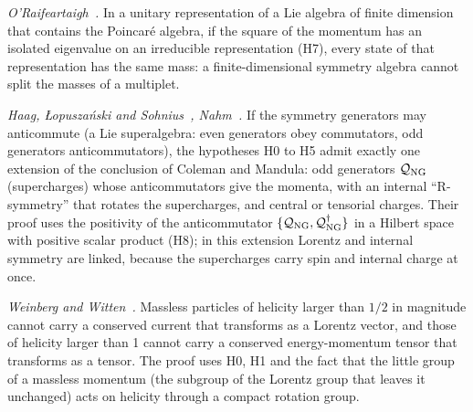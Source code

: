 \emph{O'Raifeartaigh~\cite{ORaifeartaigh1965}.} In a unitary representation of a Lie algebra of finite
dimension that contains the Poincar\'e algebra, if the square of the momentum has an isolated
eigenvalue on an irreducible representation (H7), every state of that representation has the same
mass: a finite-dimensional symmetry algebra cannot split the masses of a multiplet.

\emph{Haag, {\L}opusza\'nski and Sohnius~\cite{HLS1975}, Nahm~\cite{Nahm1978}.} If the symmetry
generators may anticommute (a Lie superalgebra: even generators obey commutators, odd generators
anticommutators), the hypotheses H0 to H5 admit exactly one extension of the conclusion of Coleman
and Mandula: odd generators $\mathcal Q_{\rm NG}$ (supercharges) whose anticommutators give the
momenta, with an internal ``R-symmetry'' that rotates the supercharges, and central or tensorial
charges. Their proof uses the positivity of the anticommutator $\{\mathcal Q_{\rm NG},
\mathcal Q_{\rm NG}^\dagger\}$ in a Hilbert space with positive scalar product (H8); in this
extension Lorentz and internal symmetry are linked, because the supercharges carry spin and internal
charge at once.

\emph{Weinberg and Witten~\cite{WeinbergWitten1980}.} Massless particles of helicity larger than $1/2$
in magnitude cannot carry a conserved current that transforms as a Lorentz vector, and those of
helicity larger than 1 cannot carry a conserved energy-momentum tensor that transforms as a tensor.
The proof uses H0, H1 and the fact that the little group of a massless momentum (the subgroup of the
Lorentz group that leaves it unchanged) acts on helicity through a compact rotation group.

